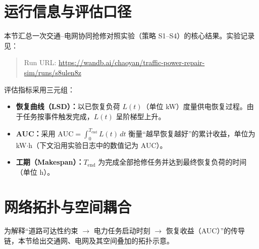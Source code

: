 \documentclass[UTF8,zihao=-4,a4paper,fontset=fandol]{ctexrep}
\begin{document}
\section{运行信息与评估口径}
本节汇总一次交通--电网协同抢修对照实验（策略 S1--S4）的核心结果。实验记录见：
\begin{quote}\small
Run URL: \url{https://wandb.ai/chaoyan/traffic-power-repair-sim/runs/s8ulen8z}
\end{quote}

\noindent 评估指标采用三元组：
\begin{itemize}[leftmargin=2em]
  \item \textbf{恢复曲线（LSD）：}以已恢复负荷 $L(t)$（单位 kW）度量供电恢复过程。由于任务按事件触发完成，$L(t)$ 呈阶梯型上升。
  \item \textbf{AUC：}采用 $\mathrm{AUC}=\int_{0}^{T_{\text{end}}} L(t)\,dt$ 衡量“越早恢复越好”的累计收益，单位为 kW$\cdot$h（下文沿用实验日志中的数值记为 AUC）。
  \item \textbf{工期（Makespan）：}$T_{\text{end}}$ 为完成全部抢修任务并达到最终恢复负荷的时间（单位 h）。
\end{itemize}


\section{网络拓扑与空间耦合}
为解释“道路可达性约束 $\rightarrow$ 电力任务启动时刻 $\rightarrow$ 恢复收益（AUC）”的传导链，本节给出交通网、电网及其空间叠加的拓扑示意。
\end{document}
